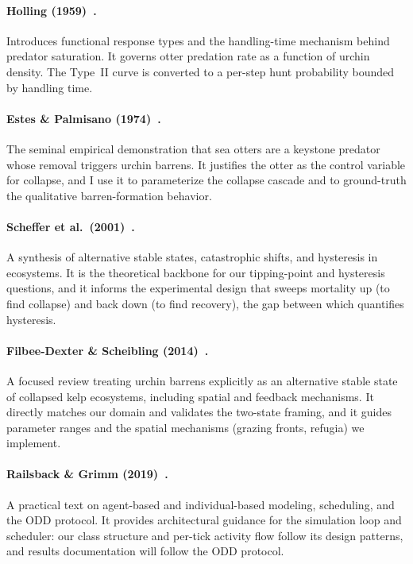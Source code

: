 \documentclass[manuscript,nonacm,11pt]{acmart}
\begin{document}

\paragraph{Holling (1959)~\cite{holling1959}.} Introduces functional response
types and the handling-time mechanism behind predator saturation.
It governs otter predation rate as a function of urchin
density. The Type~II curve is converted to a per-step hunt
probability bounded by handling time.

\paragraph{Estes \& Palmisano (1974)~\cite{estes1974}.} The seminal empirical
demonstration that sea otters are a keystone predator whose removal triggers
urchin barrens. It justifies the otter as the control variable for collapse, and
I use it to parameterize the collapse cascade and to ground-truth the
qualitative barren-formation behavior.

\paragraph{Scheffer et al.\ (2001)~\cite{scheffer2001}.} A synthesis of
alternative stable states, catastrophic shifts, and hysteresis in ecosystems.
It is the theoretical backbone for our tipping-point and hysteresis questions,
and it informs the experimental design that sweeps mortality up (to find
collapse) and back down (to find recovery), the gap between which quantifies
hysteresis.

\paragraph{Filbee-Dexter \& Scheibling (2014)~\cite{filbeedexter2014}.} A
focused review treating urchin barrens explicitly as an alternative stable state
of collapsed kelp ecosystems, including spatial and feedback mechanisms.
It directly matches our domain and validates the two-state framing, and it
guides parameter ranges and the spatial mechanisms (grazing fronts, refugia)
we implement.

\paragraph{Railsback \& Grimm (2019)~\cite{railsback2019}.} A practical text on
agent-based and individual-based modeling, scheduling, and the ODD protocol.
It provides architectural guidance for the simulation loop and scheduler: our
class structure and per-tick activity flow follow its design patterns, and
results documentation will follow the ODD protocol.
\end{document}
